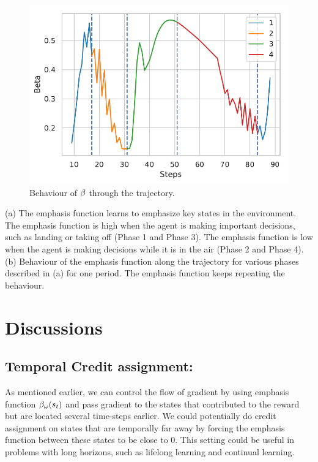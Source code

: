 \begin{figure}
    \centering
    \includegraphics[scale=0.8]{fig/beta_hopper.pdf}
    \caption[Emphasis function through the trajectory]{Behaviour of $\beta$ through the trajectory.}
    \label{fig:cyle_hopper}
\end{figure}
(a) The emphasis function learns to emphasize key states in the environment. The emphasis function is high when the agent is making important decisions, such as landing or taking off (Phase 1 and Phase 3). The emphasis function is low when the agent is making decisions while it is in the air (Phase 2 and Phase 4). (b) Behaviour of the emphasis function along the trajectory for various phases described in (a) for one period. The emphasis function keeps repeating the behaviour.
\section{Discussions}
\subsection{Temporal Credit assignment:} As mentioned earlier, we can control the flow of gradient by using emphasis function $\beta_{\omega}(s_t)$ and pass gradient to the states that contributed to the reward but are located several time-steps earlier. We could potentially do credit assignment on states that are temporally far away by forcing the emphasis function between these states to be close to $0$. This setting could be useful in problems with long horizons, such as lifelong learning and continual learning.

